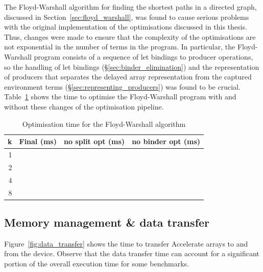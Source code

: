 The Floyd-Warshall algorithm for finding the shortest paths in a directed graph,
discussed in Section~\ref{sec:floyd_warshall}, was found to cause serious
problems with the original implementation of the optimisations discussed in this
thesis. Thus, changes were made to ensure that the complexity of the
optimisations are not exponential in the number of terms in the program. In
particular, the Floyd-Warshall program consists of a sequence of let bindings to
producer operations, so the handling of let bindings
(\S\ref{sec:binder_elimination}) and the representation of producers that
separates the delayed array representation from the captured environment terms
(\S\ref{sec:representing_producers}) was found to be crucial.
Table~\ref{tab:floyd_warshal_opt} shows the time to optimise the Floyd-Warshall
program with and without these changes of the optimisation pipeline.


\begin{table}
    \centering
    \begin{tabular}{rrrr}
\textbf{k}
    & \multicolumn{1}{c}{Final (ms)}
    & \multicolumn{1}{c}{no split opt (ms)}
    & \multicolumn{1}{c}{no binder opt (ms)}
    \\
    \hline

1   &
    &
    &
    \\

2   &
    &
    &
    \\

4   &
    &
    &
    \\

8   &
    &
    &
    \\

    \end{tabular}
    \caption{Optimisation time for the Floyd-Warshall algorithm}
    \label{tab:floyd_warshal_opt}
\end{table}


\subsection{Memory management \& data transfer}

Figure~\ref{fig:data_transfer} shows the time to transfer Accelerate arrays to
and from the device. Observe that the data transfer time can account for a
significant portion of the overall execution time for some benchmarks.



